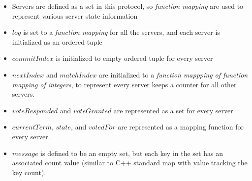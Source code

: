 \documentclass{report}
\begin{document}
\begin{tlatex}
\@x{}\moduleLeftDash{}\moduleRightDash\@xx{}%
%
%
\@x{}%
%
\@xx{}%
\@x{}%
%
\@xx{}%
\@x{}%
%
\@xx{}%
%
%
%
%
%
\@x{}\bottombar\@xx{}%
\end{tlatex}

\begin{itemize}
    \item Servers are defined as a set in this protocol, so \textit{function
    mapping} are used to represent various server state information
    \item $log$ is set to a \textit{function mapping} for all the servers, and each
    server is initialized as an ordered tuple
    \item $commitIndex$ is initialized to empty ordered tuple for every server
    \item $nextIndex$ and $matchIndex$ are initialized to a \textit{function
    mappping of function mapping of integers}, to represent every server keeps a
    counter for all other servers. 
    \item $voteResponded$ and $voteGranted$ are represented as a set for every server
    \item $currentTerm$, $state$, and $votedFor$ are represented as a mapping
    function for every server. 
    \item $message$ is defined to be an empty set, but each key in the set has
    an associated count value (similar to C++ standard map with value tracking
    the key count). 
\end{itemize}
\end{document}
